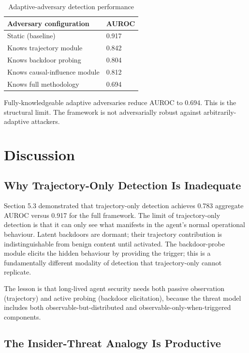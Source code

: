 \documentclass[sigconf,nonacm]{acmart}
\begin{document}
\begin{table}[h]
\caption{Adaptive-adversary detection performance}
\label{tab:adaptive}
\small
\begin{tabularx}{\columnwidth}{@{}p{3.4cm}X@{}}
\toprule
\textbf{Adversary configuration} & \textbf{AUROC} \\
\midrule
Static (baseline)                & 0.917 \\
Knows trajectory module          & 0.842 \\
Knows backdoor probing           & 0.804 \\
Knows causal-influence module    & 0.812 \\
Knows full methodology           & 0.694 \\
\bottomrule
\end{tabularx}
\end{table}

Fully-knowledgeable adaptive adversaries reduce AUROC to 0.694.
This is the structural limit. The framework is not adversarially
robust against arbitrarily-adaptive attackers.

\section{Discussion}

\subsection{Why Trajectory-Only Detection Is Inadequate}

Section 5.3 demonstrated that trajectory-only detection achieves
0.783 aggregate AUROC versus 0.917 for the full framework. The
limit of trajectory-only detection is that it can only see what
manifests in the agent's normal operational behaviour. Latent
backdoors are dormant; their trajectory contribution is
indistinguishable from benign content until activated. The
backdoor-probe module elicits the hidden behaviour by providing
the trigger; this is a fundamentally different modality of
detection that trajectory-only cannot replicate.

The lesson is that long-lived agent security needs both passive
observation (trajectory) and active probing (backdoor elicitation),
because the threat model includes both observable-but-distributed
and observable-only-when-triggered components.

\subsection{The Insider-Threat Analogy Is Productive}
\end{document}
